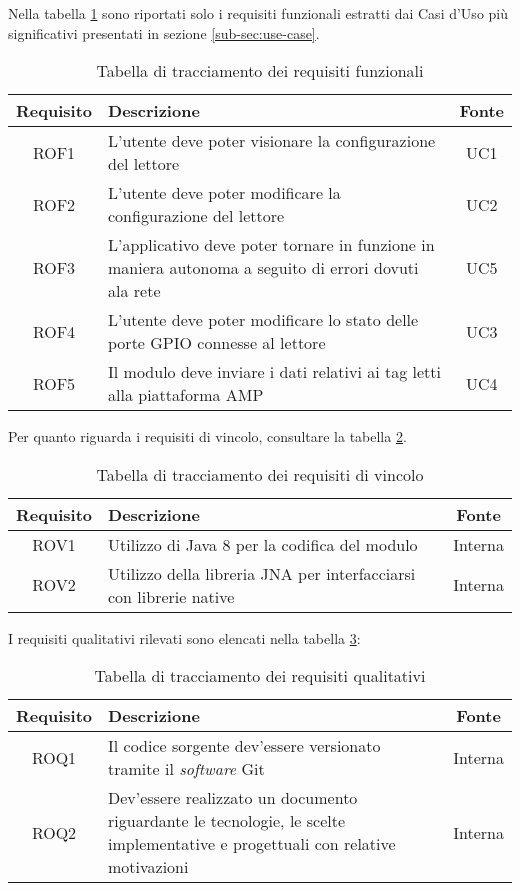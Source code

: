 Nella tabella \ref{tab:requisiti-fun} sono riportati solo i requisiti funzionali estratti dai Casi d'Uso più significativi presentati in sezione \ref{sub-sec:use-case}.
\begin{table}[!htb]
    \begin{tabularx}{\textwidth}{ | c | X | c |}
    \hline
    \textbf{Requisito} & \textbf{Descrizione} & \textbf{Fonte}\\
    \hline
    ROF1 & L'utente deve poter visionare la configurazione del lettore & UC1 \\
    \hline
    ROF2 & L'utente deve poter modificare la configurazione del lettore & UC2 \\
    \hline
    ROF3 & L'applicativo deve poter tornare in funzione in maniera autonoma a seguito di errori dovuti ala rete & UC5 \\
    \hline
    ROF4 & L'utente deve poter modificare lo stato delle porte GPIO connesse al lettore & UC3 \\
    \hline
    ROF5 & Il modulo deve inviare i dati relativi ai tag letti alla piattaforma AMP & UC4 \\
    \hline
    \end{tabularx}
    \caption{Tabella di tracciamento dei requisiti funzionali}
    \label{tab:requisiti-fun}
\end{table}
Per quanto riguarda i requisiti di vincolo, consultare la tabella \ref{tab:requisiti-vinc}.
\begin{table}[!htb]
    \begin{tabularx}{\textwidth}{ | c | X | c |}
    \hline
    \textbf{Requisito} & \textbf{Descrizione} & \textbf{Fonte}\\
    \hline
    ROV1 & Utilizzo di Java 8 per la codifica del modulo & Interna \\
    \hline
    ROV2 & Utilizzo della libreria JNA per interfacciarsi con librerie native & Interna \\
    \hline
    \end{tabularx}
    \caption{Tabella di tracciamento dei requisiti di vincolo}
    \label{tab:requisiti-vinc}
\end{table}
I requisiti qualitativi rilevati sono elencati nella tabella \ref{tab:requisiti-qual}:
\begin{table}[!htb]
    \begin{tabularx}{\textwidth}{ | c | X | c |}
    \hline
    \textbf{Requisito} & \textbf{Descrizione} & \textbf{Fonte}\\
    \hline
    ROQ1 & Il codice sorgente dev'essere versionato tramite il \emph{software} Git & Interna \\
    \hline
    ROQ2 & Dev'essere realizzato un documento riguardante le tecnologie, le scelte implementative e progettuali con relative motivazioni & Interna \\
    \hline
    \end{tabularx}
    \caption{Tabella di tracciamento dei requisiti qualitativi}
    \label{tab:requisiti-qual}
\end{table}
